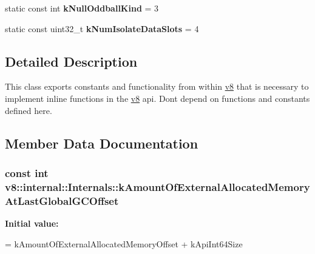 \begin{DoxyCompactItemize}
\item 
\hypertarget{classv8_1_1internal_1_1_internals_a72243c5512cb5cab9d10b6f29e775180}{}static const int {\bfseries k\+Null\+Oddball\+Kind} = 3\label{classv8_1_1internal_1_1_internals_a72243c5512cb5cab9d10b6f29e775180}

\item 
\hypertarget{classv8_1_1internal_1_1_internals_a258de87ae638f06a1deebccf4fd93c3f}{}static const uint32\+\_\+t {\bfseries k\+Num\+Isolate\+Data\+Slots} = 4\label{classv8_1_1internal_1_1_internals_a258de87ae638f06a1deebccf4fd93c3f}

\end{DoxyCompactItemize}


\subsection{Detailed Description}
This class exports constants and functionality from within \hyperlink{namespacev8}{v8} that is necessary to implement inline functions in the \hyperlink{namespacev8}{v8} api. Don\textquotesingle{}t depend on functions and constants defined here. 

\subsection{Member Data Documentation}
\hypertarget{classv8_1_1internal_1_1_internals_a4839a352b8fc929d6f05028abe0db272}{}
\subsubsection[{k\+Amount\+Of\+External\+Allocated\+Memory\+At\+Last\+Global\+G\+C\+Offset}]{\setlength{\rightskip}{0pt plus 5cm}const int v8\+::internal\+::\+Internals\+::k\+Amount\+Of\+External\+Allocated\+Memory\+At\+Last\+Global\+G\+C\+Offset\hspace{0.3cm}{\ttfamily [static]}}\label{classv8_1_1internal_1_1_internals_a4839a352b8fc929d6f05028abe0db272}
{\bfseries Initial value\+:}
\begin{DoxyCode}
=
      kAmountOfExternalAllocatedMemoryOffset + kApiInt64Size
\end{DoxyCode}
\hypertarget{classv8_1_1internal_1_1_internals_a715b5e2c414c5efd35c5e01d4f2b9f85}{}
